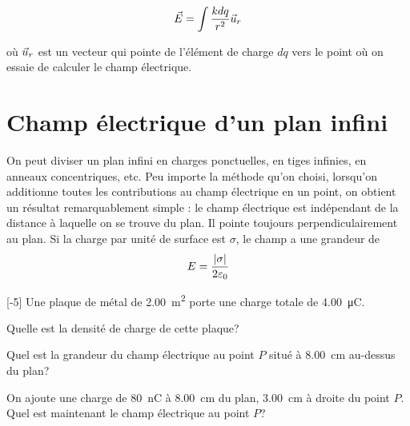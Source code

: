 \begin{align*}
  \vec{E} = \int \frac{kdq}{r^2} \vec{u}_r
\end{align*}

où $\vec{u}_r$ est un vecteur qui pointe de l'élément de charge $dq$ vers le point
où on essaie de calculer le champ électrique.




\section{Champ électrique d'un plan infini}


On peut diviser un plan infini en charges ponctuelles, en tiges infinies, en
anneaux concentriques, etc. Peu importe la méthode qu'on choisi, lorsqu'on
additionne toutes les contributions au champ électrique en un point, on obtient
un résultat remarquablement simple : le champ électrique est indépendant de la
distance à laquelle on se trouve du plan. Il pointe toujours
perpendiculairement au plan. Si la charge par unité de surface est $\sigma$, le
champ a une grandeur de
\begin{align*}
  E = \frac{\left| \sigma \right|}{2\varepsilon_0}
\end{align*}


\begin{diapobox}
  [-5\baselineskip]
  Une plaque de métal de \SI{2.00}{\meter\squared} porte une charge totale de
  \SI{4.00}{\micro\coulomb}. 

  Quelle est la densité de charge de cette plaque?

  Quel est la grandeur du champ électrique au point $P$ situé à
  \SI{8.00}{\centi\meter} au-dessus du plan?

  On ajoute une charge de \SI{80}{\nano\coulomb} à \SI{8.00}{\centi\meter} du
  plan, \SI{3.00}{\centi\meter} à droite du point $P$. Quel est maintenant le
  champ électrique au point $P$?

\end{diapobox}







